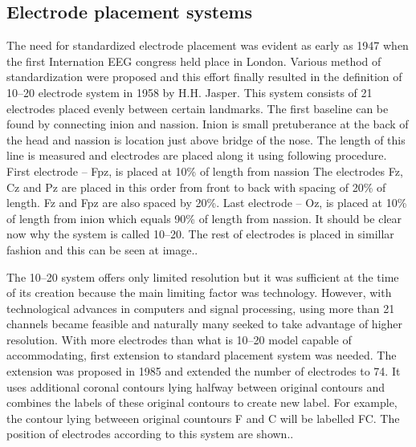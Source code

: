 \subsection{Electrode placement systems}
The need for standardized electrode placement was evident as early as 1947 when
the first Internation EEG congress held place in London. Various method of
standardization were proposed and this effort finally resulted in the definition
of 10--20 electrode system in 1958 by H.H. Jasper. \cite{placeSys} 
This system consists of 21 electrodes placed evenly between certain landmarks.
The first baseline can be found by connecting inion and nassion. Inion is small
pretuberance at the back of the head and nassion is location just above bridge
of the nose. The length of this line is measured and electrodes are placed along
it using following procedure. First electrode -- Fpz, is placed at 10\% of
length from nassion The electrodes Fz, Cz and Pz are placed in this order from
front to back with spacing of 20\% of length. Fz and Fpz are also spaced by
20\%. Last electrode -- Oz, is placed at 10\% of length from inion which equals
90\% of length from nassion. It should be clear now why the system is called
10--20. The rest of electrodes is placed in simillar fashion and this can be
seen at image.. %

The 10--20 system offers only limited resolution but it was sufficient at the
time of its creation because the main limiting factor was technology. However,
with technological advances in computers and signal processing, using more than
21 channels became feasible and naturally many seeked to take advantage of
higher resolution. With more electrodes than what is 10--20 model capable of
accommodating, first extension to standard placement system was needed. The
extension was proposed in 1985 and extended the number of electrodes to 74. It
uses additional coronal contours lying halfway between original contours and
combines the labels of these original contours to create new label.
For example, the contour lying betweeen original countours F and C will be
labelled FC. \cite{placeSys} The position of electrodes according to this system
are shown.. %

